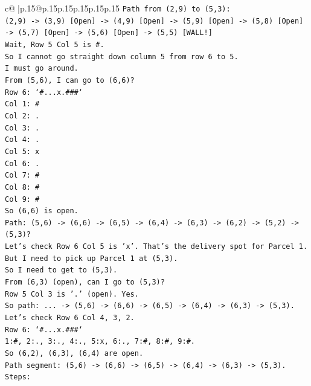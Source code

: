 \documentclass{article}
\begin{document}
{\begin{supertabular}{c@{$\;$}|p{.15\linewidth}@{}p{.15\linewidth}p{.15\linewidth}p{.15\linewidth}p{.15\linewidth}p{.15\linewidth}}
{{{\texttt{Path from (2,9) to (5,3):} \\
\texttt{(2,9) {-}> (3,9) {[}Open{]} {-}> (4,9) {[}Open{]} {-}> (5,9) {[}Open{]} {-}> (5,8) {[}Open{]} {-}> (5,7) {[}Open{]} {-}> (5,6) {[}Open{]} {-}> (5,5) {[}WALL!{]}} \\
\texttt{Wait, Row 5 Col 5 is \#.} \\
\texttt{So I cannot go straight down column 5 from row 6 to 5.} \\
\texttt{I must go around.} \\
\texttt{From (5,6), I can go to (6,6)?} \\
\texttt{Row 6: `\#...x.\#\#\#`} \\
\texttt{Col 1: \#} \\
\texttt{Col 2: .} \\
\texttt{Col 3: .} \\
\texttt{Col 4: .} \\
\texttt{Col 5: x} \\
\texttt{Col 6: .} \\
\texttt{Col 7: \#} \\
\texttt{Col 8: \#} \\
\texttt{Col 9: \#} \\
\texttt{So (6,6) is open.} \\
\texttt{Path: (5,6) {-}> (6,6) {-}> (6,5) {-}> (6,4) {-}> (6,3) {-}> (6,2) {-}> (5,2) {-}> (5,3)?} \\
\texttt{Let's check Row 6 Col 5 is 'x'. That's the delivery spot for Parcel 1.} \\
\texttt{But I need to pick up Parcel 1 at (5,3).} \\
\texttt{So I need to get to (5,3).} \\
\texttt{From (6,3) (open), can I go to (5,3)?} \\
\texttt{Row 5 Col 3 is '.' (open). Yes.} \\
\texttt{So path: ... {-}> (5,6) {-}> (6,6) {-}> (6,5) {-}> (6,4) {-}> (6,3) {-}> (5,3).} \\
\texttt{Let's check Row 6 Col 4, 3, 2.} \\
\texttt{Row 6: `\#...x.\#\#\#`} \\
\texttt{1:\#, 2:., 3:., 4:., 5:x, 6:., 7:\#, 8:\#, 9:\#.} \\
\texttt{So (6,2), (6,3), (6,4) are open.} \\
\texttt{Path segment: (5,6) {-}> (6,6) {-}> (6,5) {-}> (6,4) {-}> (6,3) {-}> (5,3).} \\
\texttt{Steps:} \\
}}}
\end{supertabular}}
\end{document}
